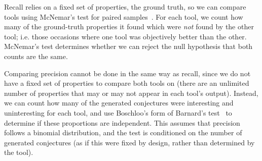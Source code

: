 Recall relies on a fixed set of properties, the ground truth, so we can compare
tools using McNemar's test for paired samples~\cite{mcnemar1947note}. For each
tool, we count how many of the ground-truth properties it found which were
\emph{not} found by the other tool; i.e. those occasions where one tool was
objectively better than the other. McNemar's test determines whether we can
reject the null hypothesis that both counts are the same.

Comparing precision cannot be done in the same way as recall, since we do not
have a fixed set of properties to compare both tools on (there are an unlimited
number of properties that may or may not appear in each tool's output). Instead,
we can count how many of the generated conjectures were interesting and
uninteresting for each tool, and use Boschloo's form of Barnard's
test~\cite{lydersen2009recommended} to determine if these proportions are
independent. This assumes that precision follows a binomial distribution, and
the test is conditioned on the number of generated conjectures (as if this were
fixed by design, rather than determined by the tool).

